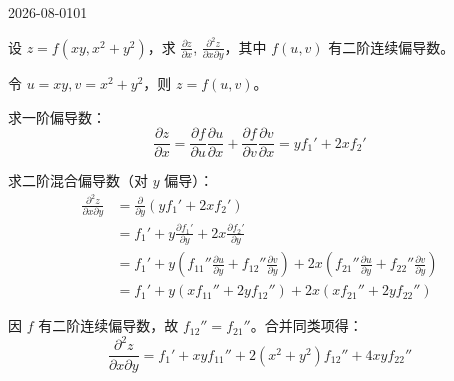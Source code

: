 \begin{mistake}{2026-08-01}{01}

\begin{problemcontent}
设 \(z = f(xy, x^2 + y^2)\)，求 \(\frac{\partial z}{\partial x}\), \(\frac{\partial^2 z}{\partial x \partial y}\)，其中 \(f(u, v)\) 有二阶连续偏导数。
\end{problemcontent}

\begin{solutioncontent}
令 \(u = xy, v = x^2 + y^2\)，则 \(z = f(u, v)\)。

求一阶偏导数：
\[
\frac{\partial z}{\partial x} = \frac{\partial f}{\partial u}\frac{\partial u}{\partial x} + \frac{\partial f}{\partial v}\frac{\partial v}{\partial x} = y f_1' + 2x f_2'
\]

求二阶混合偏导数（对 \(y\) 偏导）：
\[
\begin{aligned}
\frac{\partial^2 z}{\partial x \partial y} &= \frac{\partial}{\partial y}(y f_1' + 2x f_2') \\
&= f_1' + y \frac{\partial f_1'}{\partial y} + 2x \frac{\partial f_2'}{\partial y} \\
&= f_1' + y \left( f_{11}'' \frac{\partial u}{\partial y} + f_{12}'' \frac{\partial v}{\partial y} \right) + 2x \left( f_{21}'' \frac{\partial u}{\partial y} + f_{22}'' \frac{\partial v}{\partial y} \right) \\
&= f_1' + y(x f_{11}'' + 2y f_{12}'') + 2x(x f_{21}'' + 2y f_{22}'')
\end{aligned}
\]

因 \(f\) 有二阶连续偏导数，故 \(f_{12}'' = f_{21}''\)。合并同类项得：
\[
\frac{\partial^2 z}{\partial x \partial y} = f_1' + xy f_{11}'' + 2(x^2 + y^2) f_{12}'' + 4xy f_{22}''
\]
\end{solutioncontent}


\end{mistake}
